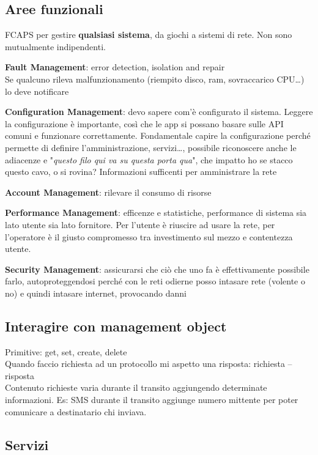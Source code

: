 \documentclass[10pt]{book}
\begin{document}
\subsection{Aree funzionali}
FCAPS per gestire \textbf{qualsiasi sistema}, da giochi a sistemi di rete. Non sono mutualmente indipendenti.
\begin{list}{}{}
	\item \textbf{Fault Management}: error detection, isolation and repair\\
	Se qualcuno rileva malfunzionamento (riempito disco, ram, sovraccarico CPU\ldots) lo deve notificare
	\item \textbf{Configuration Management}: devo sapere com'è configurato il sistema. Leggere la configurazione è importante, così che le app si possano basare sulle API comuni e funzionare correttamente. Fondamentale capire la configurazione perché permette di definire l'amministrazione, servizi\ldots, possibile riconoscere anche le adiacenze e "\textit{questo filo qui va su questa porta qua}", che impatto ho se stacco questo cavo, o si rovina? Informazioni sufficenti per amministrare la rete
	\item \textbf{Account Management}: rilevare il consumo di risorse
	\item \textbf{Performance Management}: efficenze e statistiche, performance di sistema sia lato utente sia lato fornitore. Per l'utente è riuscire ad usare la rete, per l'operatore è il giusto compromesso tra investimento sul mezzo e contentezza utente.
	\item \textbf{Security Management}: assicurarsi che ciò che uno fa è effettivamente possibile farlo, autoproteggendosi perché con le reti odierne posso intasare rete (volente o no) e quindi intasare internet, provocando danni
\end{list}
\subsection{Interagire con management object}
Primitive: get, set, create, delete\\
Quando faccio richiesta ad un protocollo mi aspetto una risposta: richiesta -- risposta\\
Contenuto richieste varia durante il transito aggiungendo determinate informazioni. Es: SMS durante il transito aggiunge numero mittente per poter comunicare a destinatario chi inviava.
\subsection{Servizi}
\end{document}
